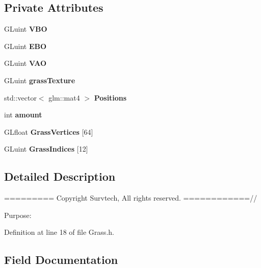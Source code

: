 \subsection*{Private Attributes}
\begin{DoxyCompactItemize}
\item 
G\+Luint {\bfseries V\+BO}\hypertarget{class_grass_a94546b98c58f2a74a91ad59f73036f8b}{}\label{class_grass_a94546b98c58f2a74a91ad59f73036f8b}

\item 
G\+Luint {\bfseries E\+BO}\hypertarget{class_grass_a054fd25dde0d19e2b272f8aa611e7b3e}{}\label{class_grass_a054fd25dde0d19e2b272f8aa611e7b3e}

\item 
G\+Luint {\bfseries V\+AO}\hypertarget{class_grass_a35f97e4d959542776ba90ad2e0908260}{}\label{class_grass_a35f97e4d959542776ba90ad2e0908260}

\item 
G\+Luint {\bfseries grass\+Texture}\hypertarget{class_grass_a026bbcbfbb49b9557801943723cb01be}{}\label{class_grass_a026bbcbfbb49b9557801943723cb01be}

\item 
std\+::vector$<$ glm\+::mat4 $>$ {\bfseries Positions}\hypertarget{class_grass_a816ecede6a8d916dbeb4e446de98c5a5}{}\label{class_grass_a816ecede6a8d916dbeb4e446de98c5a5}

\item 
int {\bfseries amount}\hypertarget{class_grass_a129256ec74373edd2d18654102ade669}{}\label{class_grass_a129256ec74373edd2d18654102ade669}

\item 
G\+Lfloat {\bfseries Grass\+Vertices} \mbox{[}64\mbox{]}
\item 
G\+Luint {\bfseries Grass\+Indices} \mbox{[}12\mbox{]}
\end{DoxyCompactItemize}


\subsection{Detailed Description}
========= Copyright Survtech, All rights reserved. ============//

Purpose\+: 

 

Definition at line 18 of file Grass.\+h.



\subsection{Field Documentation}
